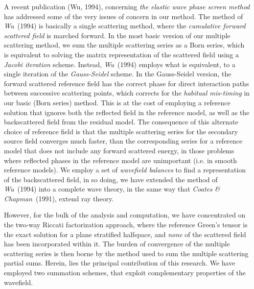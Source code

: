 A recent publication (Wu, 1994), 
concerning {\em the elastic wave phase screen method\/} has addressed 
some of the very issues of concern in our method.  The method of {\em Wu\/}~(1994) is 
basically a single scattering method, where the {\em cumulative forward 
scattered field\/} is marched forward. In the most basic version of our 
multiple scattering  
method, we sum the multiple 
scattering series as a Born series, which is equivalent to 
solving the matrix representation of the scattered field using a {\em Jacobi 
iteration\/} scheme. Instead, {\em Wu\/}~(1994) employs 
what is equivalent, to a single iteration of the {\em Gauss-Seidel\/} scheme. 
In the Gauss-Seidel version,  the forward scattered reference field  has the 
correct phase for direct interaction paths between successive scattering 
points, which corrects for the {\em habitual mis-timing\/} in our basic 
(Born series) method. This is at the cost of employing a reference 
solution that ignores both the reflected 
field in the reference model, as well as the backscattered field from the 
residual model.
The consequence of this alternate choice of reference field is that the 
multiple scattering series for the secondary source field converges much faster, 
than the corresponding series for 
a reference model that does not include any forward scattered energy, in 
those problems where reflected phases in the reference model are 
unimportant (i.e. in smooth reference models).
We employ a set of {\em wavefield balances\/} to find a representation of 
the backscattered field, in so doing,
we  have extended the method of {\em Wu\/}~(1994) 
into a complete wave theory, in the same way that {\em Coates \& 
Chapman\/}~(1991), extend ray theory. 

However, for the bulk of the analysis and computation, we have 
concentrated on the two-way Riccati factorization approach, where the 
reference Green's tensor is the exact solution for a plane stratified 
halfspace, and {\em none\/} of the scattered field has been incorporated 
within it. The burden of convergence of the multiple scattering series is 
then borne by the method used to sum the multiple scattering partial sums. 
Herein, lies the principal contribution of this research. We have 
employed two summation schemes, that exploit complementary properties of 
the wavefield. 

